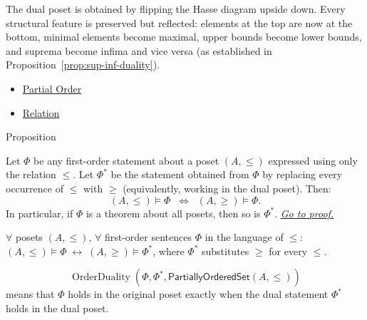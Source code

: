 \begin{remark*}[Exposition]
The dual poset is obtained by flipping the Hasse diagram upside down.  Every
structural feature is preserved but reflected: elements at the top are now at
the bottom, minimal elements become maximal, upper bounds become lower bounds,
and suprema become infima and vice versa (as established in
Proposition~\ref{prop:sup-inf-duality}).
\end{remark*}

\begin{dependencies}
\begin{itemize}
  \item \hyperref[def:partial-order]{Partial Order}
  \item \hyperref[def:relation]{Relation}
\end{itemize}
\end{dependencies}


\begin{propositionbox}{Proposition}
\begin{proposition}
\label{prop:order-duality}
Let $\Phi$ be any first-order statement about a poset $(A, \leq)$ expressed
using only the relation $\leq$.  Let $\Phi^*$ be the statement obtained from
$\Phi$ by replacing every occurrence of $\leq$ with $\geq$ (equivalently,
working in the dual poset).  Then:
\[
  (A, \leq) \models \Phi
  \;\;\Longleftrightarrow\;\;
  (A, \geq) \models \Phi.
\]
In particular, if $\Phi$ is a theorem about all posets, then so is $\Phi^*$.
\hyperref[prf:order-duality]{\textit{Go to proof.}}
\end{proposition}
\end{propositionbox}

\begin{remark*}
$\forall$ posets $(A,\leq)$, $\forall$ first-order sentences $\Phi$ in the
language of $\leq$: $(A,\leq)\models\Phi \;\leftrightarrow\; (A,\geq)\models\Phi^*$,
where $\Phi^*$ substitutes $\geq$ for every $\leq$.
\end{remark*}

\begin{remark*}
\[
  \operatorname{OrderDuality}(\Phi,\Phi^*,\mathsf{PartiallyOrderedSet}(A,\leq))
\]
means that $\Phi$ holds in the original poset exactly when the dual statement
$\Phi^*$ holds in the dual poset.
\end{remark*}


